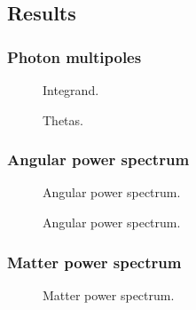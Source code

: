 \subsection{Results}\label{ssec:M4:results}

\subsubsection{Photon multipoles} \label{sssec:M4:results:photons_multipoles}
\begin{figure}[ht!]
    \caption{Integrand.}
    \label{fig:M4:results:integrand_thetas}
\end{figure}


\begin{figure}[ht!]
    \caption{Thetas.}
    \label{fig:M4:results:thetas}
\end{figure}

\subsubsection{Angular power spectrum} \label{sssec:M4:results:angular_power_spectrum}
\begin{figure}[ht!]
    \caption{Angular power spectrum.}
    \label{fig:M4:results:cells}
\end{figure}


\begin{figure}[ht!]
    \caption{Angular power spectrum.}
    \label{fig:M4:results:cells_components}
\end{figure}

\subsubsection{Matter power spectrum} \label{sssec:M4:results:matter_power_spectrum}
\begin{figure}[ht!]
    \caption{Matter power spectrum.}
    \label{fig:M4:results:matterPS_nk1000}
\end{figure}